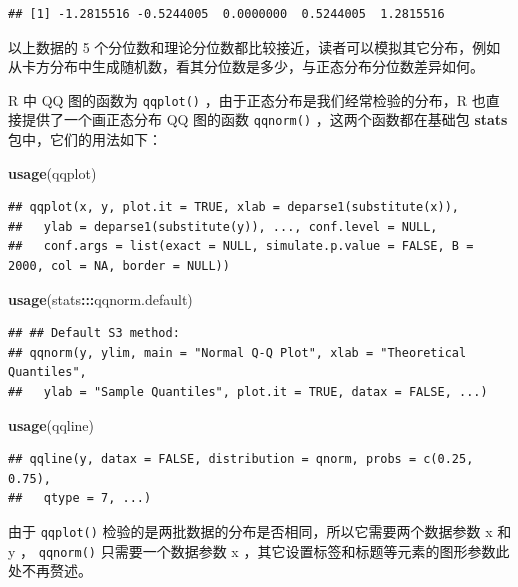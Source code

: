 \documentclass[
  b5paper,
  UTF8,twoside]{book}
\newenvironment{Shaded}{\begin{snugshade}}{\end{snugshade}}
\newcommand{\FunctionTok}[1]{\textcolor[rgb]{0.13,0.29,0.53}{\textbf{#1}}}
\newcommand{\NormalTok}[1]{#1}
\newcommand{\SpecialCharTok}[1]{\textcolor[rgb]{0.81,0.36,0.00}{\textbf{#1}}}
\begin{document}
\begin{verbatim}
## [1] -1.2815516 -0.5244005  0.0000000  0.5244005  1.2815516
\end{verbatim}

以上数据的 5 个分位数和理论分位数都比较接近，读者可以模拟其它分布，例如从卡方分布中生成随机数，看其分位数是多少，与正态分布分位数差异如何。

R 中 QQ 图的函数为 \texttt{qqplot()} ，由于正态分布是我们经常检验的分布，R 也直接提供了一个画正态分布 QQ 图的函数 \texttt{qqnorm()} ，这两个函数都在基础包 \textbf{stats} 包中，它们的用法如下：

\begin{Shaded}
\begin{Highlighting}[]
\FunctionTok{usage}\NormalTok{(qqplot)}
\end{Highlighting}
\end{Shaded}

\begin{verbatim}
## qqplot(x, y, plot.it = TRUE, xlab = deparse1(substitute(x)),
##   ylab = deparse1(substitute(y)), ..., conf.level = NULL,
##   conf.args = list(exact = NULL, simulate.p.value = FALSE, B = 2000, col = NA, border = NULL))
\end{verbatim}

\begin{Shaded}
\begin{Highlighting}[]
\FunctionTok{usage}\NormalTok{(stats}\SpecialCharTok{:::}\NormalTok{qqnorm.default)}
\end{Highlighting}
\end{Shaded}

\begin{verbatim}
## ## Default S3 method:
## qqnorm(y, ylim, main = "Normal Q-Q Plot", xlab = "Theoretical Quantiles",
##   ylab = "Sample Quantiles", plot.it = TRUE, datax = FALSE, ...)
\end{verbatim}

\begin{Shaded}
\begin{Highlighting}[]
\FunctionTok{usage}\NormalTok{(qqline)}
\end{Highlighting}
\end{Shaded}

\begin{verbatim}
## qqline(y, datax = FALSE, distribution = qnorm, probs = c(0.25, 0.75),
##   qtype = 7, ...)
\end{verbatim}

由于 \texttt{qqplot()} 检验的是两批数据的分布是否相同，所以它需要两个数据参数 x 和 y ， \texttt{qqnorm()} 只需要一个数据参数 x ，其它设置标签和标题等元素的图形参数此处不再赘述。
\end{document}
